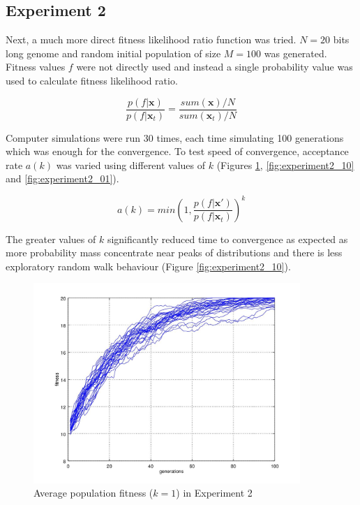 \documentclass{article}
\begin{document}
\subsection{Experiment 2}

Next, a much more direct fitness likelihood ratio function was tried. $N=20$ bits long genome and random initial population of size $M=100$ was generated. Fitness values $f$ were not directly used and instead a single probability value was used to calculate fitness likelihood ratio.

\begin{equation}
  \frac{p(f|\mathbf{x})}{p(f|\mathbf{x}_{t})} = \frac{sum(\mathbf{x})/N}{sum(\mathbf{x}_{t})/N}
\end{equation}

Computer simulations were run 30 times, each time simulating 100 generations which was enough for the convergence. To test speed of convergence, acceptance rate $a(k)$ was varied using different values of $k$ (Figures \ref{fig:experiment2_1}, \ref{fig:experiment2_10} and \ref{fig:experiment2_01}).

\begin{equation}
  \label{mcmcsampling3}
  a(k) = min(1, \frac{p(f|\mathbf{x}')}{p(f|\mathbf{x}_t)})^{k}
\end{equation}

The greater values of $k$ significantly reduced time to convergence as expected as more probability mass concentrate near peaks of distributions and there is less exploratory random walk behaviour (Figure \ref{fig:experiment2_10}).

\begin{figure}

\centering
\includegraphics[keepaspectratio,width=0.9\textwidth]{experiment2figure2_1.jpg}

\caption{Average population fitness ($k = 1$) in Experiment 2}

\label{fig:experiment2_1}

\end{figure}
\end{document}
